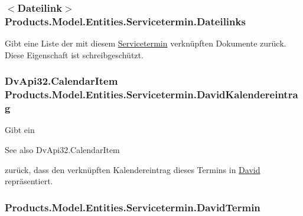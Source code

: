 \subsubsection[{\texorpdfstring{Dateilinks}{Dateilinks}}]{$<${\bf Dateilink}$>$ Products.\+Model.\+Entities.\+Servicetermin.\+Dateilinks\hspace{0.3cm}{\ttfamily [get]}}\hypertarget{class_products_1_1_model_1_1_entities_1_1_servicetermin_a8fdf7e1a0779e59e0dfc196a78a23b6b}{}\label{class_products_1_1_model_1_1_entities_1_1_servicetermin_a8fdf7e1a0779e59e0dfc196a78a23b6b}


Gibt eine Liste der mit diesem \hyperlink{class_products_1_1_model_1_1_entities_1_1_servicetermin}{Servicetermin} verknüpften Dokumente zurück. Diese Eigenschaft ist schreibgeschützt. 

\subsubsection[{\texorpdfstring{David\+Kalendereintrag}{DavidKalendereintrag}}]{\setlength{\rightskip}{0pt plus 5cm}Dv\+Api32.\+Calendar\+Item Products.\+Model.\+Entities.\+Servicetermin.\+David\+Kalendereintrag\hspace{0.3cm}{\ttfamily [get]}}\hypertarget{class_products_1_1_model_1_1_entities_1_1_servicetermin_afd11925fbf9a90a6d197638c2c7d4866}{}\label{class_products_1_1_model_1_1_entities_1_1_servicetermin_afd11925fbf9a90a6d197638c2c7d4866}


Gibt ein \begin{DoxySeeAlso}{See also}
Dv\+Api32.\+Calendar\+Item


\end{DoxySeeAlso}
zurück, dass den verknüpften Kalendereintrag dieses Termins in \hyperlink{namespace_david}{David} repräsentiert. 

\subsubsection[{\texorpdfstring{David\+Termin}{DavidTermin}}]{ Products.\+Model.\+Entities.\+Servicetermin.\+David\+Termin\hspace{0.3cm}{\ttfamily [get]}}\hypertarget{class_products_1_1_model_1_1_entities_1_1_servicetermin_ac1f32709790db5dc81ba5192241424da}{}\label{class_products_1_1_model_1_1_entities_1_1_servicetermin_ac1f32709790db5dc81ba5192241424da}


